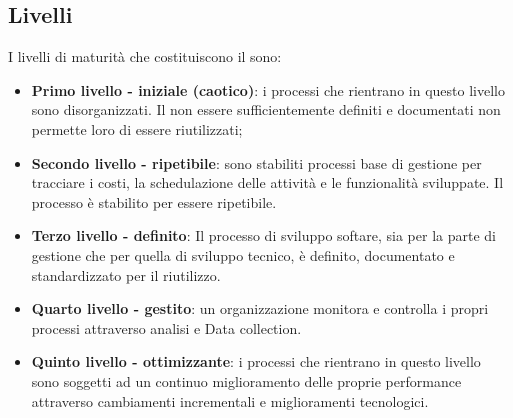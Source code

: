 \documentclass[PianoDiQualifica.tex]{subfiles}
\begin{document}
	\subsection{Livelli}
	I livelli di maturità che costituiscono il  sono:
	\begin{itemize}
		\item \textbf{Primo livello - iniziale (caotico)}: i processi che rientrano in questo livello sono disorganizzati. Il non essere sufficientemente definiti e documentati non permette loro di essere riutilizzati;
		\item \textbf{Secondo livello - ripetibile}:  
		sono stabiliti processi base di gestione per tracciare i costi, la schedulazione delle attività e le funzionalità sviluppate. Il processo è stabilito per essere ripetibile.
				\item \textbf{Terzo livello - definito}: Il processo di sviluppo softare, sia per la parte di gestione che per quella di sviluppo tecnico, è definito, documentato e standardizzato per il riutilizzo. 
		\item \textbf{Quarto livello - gestito}: un organizzazione monitora e controlla i propri processi attraverso analisi e Data collection.
		\item \textbf{Quinto livello - ottimizzante}: i processi che rientrano in questo livello sono soggetti ad un continuo miglioramento delle proprie
		performance attraverso cambiamenti incrementali e miglioramenti tecnologici.
	\end{itemize}
\end{document}
